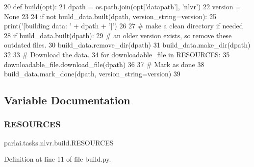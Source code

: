 \begin{DoxyCode}
20 \textcolor{keyword}{def }\hyperlink{namespacedialog__babi__feedback_1_1build_a7a9d289f7493a5ded13c4b7f071b6184}{build}(opt):
21     dpath = os.path.join(opt[\textcolor{stringliteral}{'datapath'}], \textcolor{stringliteral}{'nlvr'})
22     version = \textcolor{keywordtype}{None}
23 
24     \textcolor{keywordflow}{if} \textcolor{keywordflow}{not} build\_data.built(dpath, version\_string=version):
25         print(\textcolor{stringliteral}{'[building data: '} + dpath + \textcolor{stringliteral}{']'})
26 
27         \textcolor{comment}{# make a clean directory if needed}
28         \textcolor{keywordflow}{if} build\_data.built(dpath):
29             \textcolor{comment}{# an older version exists, so remove these outdated files.}
30             build\_data.remove\_dir(dpath)
31         build\_data.make\_dir(dpath)
32 
33         \textcolor{comment}{# Download the data.}
34         \textcolor{keywordflow}{for} downloadable\_file \textcolor{keywordflow}{in} RESOURCES:
35             downloadable\_file.download\_file(dpath)
36 
37         \textcolor{comment}{# Mark as done}
38         build\_data.mark\_done(dpath, version\_string=version)
39 \end{DoxyCode}


\subsection{Variable Documentation}
\mbox{\label{namespaceparlai_1_1tasks_1_1nlvr_1_1build_ae95d63757e7c78372c19c02ed683fe7e}} 
\subsubsection{\texorpdfstring{R\+E\+S\+O\+U\+R\+C\+ES}{RESOURCES}}
{\footnotesize\ttfamily parlai.\+tasks.\+nlvr.\+build.\+R\+E\+S\+O\+U\+R\+C\+ES}



Definition at line 11 of file build.\+py.

